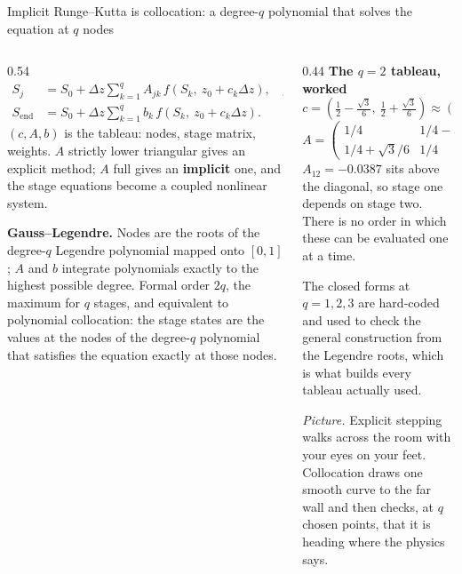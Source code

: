 \documentclass[aspectratio=169,10pt]{beamer}
\newcommand{\hl}[1]{{\color{accent}\textbf{#1}}}
\begin{document}
\begin{frame}[shrink=25]{Implicit Runge--Kutta is collocation: a degree-\texorpdfstring{$q$}{q} polynomial that solves the equation at \texorpdfstring{$q$}{q} nodes}
  \vspace{1mm}
  \begin{columns}[T]
    \begin{column}{0.54\textwidth}
      \begin{align*}
        S_j &= S_0 + \Delta z \sum_{k=1}^{q} A_{jk}\,
               f\!\left(S_k,\ z_0 + c_k \Delta z\right), \quad j = 1,\dots,q, \\
        S_{\mathrm{end}} &= S_0 + \Delta z \sum_{k=1}^{q} b_k\,
               f\!\left(S_k,\ z_0 + c_k \Delta z\right).
      \end{align*}
      $(c, A, b)$ is the tableau: nodes, stage matrix, weights. $A$ strictly
      lower triangular gives an explicit method; $A$ full gives an
      \hl{implicit} one, and the stage equations become a coupled nonlinear
      system.
      \medskip

      \textbf{Gauss--Legendre.} Nodes are the roots of the degree-$q$ Legendre
      polynomial mapped onto $[0,1]$; $A$ and $b$ integrate polynomials exactly
      to the highest possible degree. Formal order $2q$, the maximum for $q$
      stages, and equivalent to polynomial collocation: the stage states are the
      values at the nodes of the degree-$q$ polynomial that satisfies the
      equation exactly at those nodes.
    \end{column}
    \begin{column}{0.44\textwidth}
      \textbf{The $q = 2$ tableau, worked}
      \[ c = \left(\tfrac12 - \tfrac{\sqrt3}{6},\ \tfrac12 + \tfrac{\sqrt3}{6}\right)
           \approx (0.2113,\ 0.7887), \quad b = (\tfrac12, \tfrac12), \]
      \[ A = \begin{pmatrix} 1/4 & 1/4 - \sqrt3/6 \\[2pt]
                             1/4 + \sqrt3/6 & 1/4 \end{pmatrix}
           \approx \begin{pmatrix} 0.25 & -0.039 \\[2pt]
                             0.539 & 0.25 \end{pmatrix}. \]
      $A_{12} = -0.0387$ sits above the diagonal, so stage one depends on stage
      two. There is no order in which these can be evaluated one at a time.
      \medskip

      {\small The closed forms at $q = 1, 2, 3$ are hard-coded and used to check
       the general construction from the Legendre roots, which is what builds
       every tableau actually used.}
      \smallskip

      {\footnotesize\emph{Picture.} Explicit stepping walks across the room with
       your eyes on your feet. Collocation draws one smooth curve to the far
       wall and then checks, at $q$ chosen points, that it is heading where the
       physics says.}
    \end{column}
  \end{columns}
\end{frame}
\end{document}
